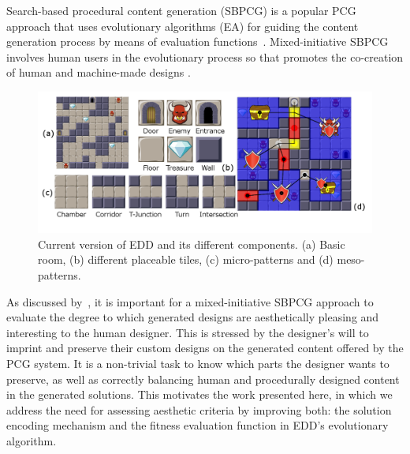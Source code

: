Search-based procedural content generation (SBPCG) is a popular PCG approach that uses evolutionary algorithms (EA) for guiding the content generation process by means of evaluation functions~. Mixed-initiative SBPCG involves human users in the evolutionary process so that promotes the co-creation of human and machine-made designs .


\begin{figure} [!h]
\centering
\includegraphics[width=\textwidth]{included-papers-tex/paper-2/pap2-figures/map-figure.png}
\caption{Current version of EDD and its different components. (a) Basic room, (b) different placeable tiles, (c) micro-patterns and (d) meso-patterns.}
\label{p2fig:eddy-map}
\end{figure}

As discussed by~, it is important for a mixed-initiative SBPCG approach to evaluate the degree to which generated designs are aesthetically pleasing and interesting to the human designer. This is stressed by the designer's will to imprint and preserve their custom designs on the generated content offered by the PCG system. It is a non-trivial task to know which parts the designer wants to preserve, as well as correctly balancing human and procedurally designed content in the generated solutions. This motivates the work presented here, in which we address the need for assessing aesthetic criteria by improving both: the solution encoding mechanism and the fitness evaluation function in EDD's evolutionary algorithm.

